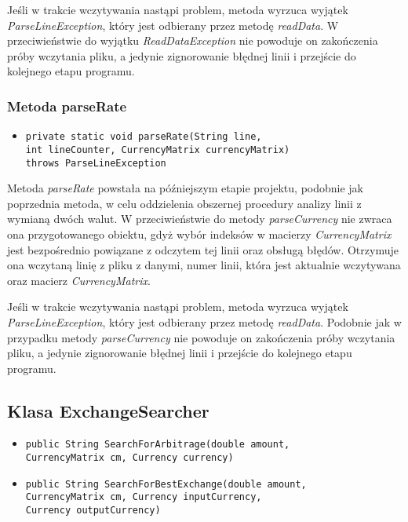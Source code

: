 \documentclass[a4paper,12pt]{article}
\newcommand\tab[1][0.6cm]{\hspace*{#1}}
\begin{document}
Jeśli w trakcie wczytywania nastąpi problem, metoda wyrzuca wyjątek \textit{ParseLineException}, który jest odbierany przez metodę \textit{readData}. W przeciwieństwie do wyjątku \textit{ReadDataException} nie powoduje on zakończenia próby wczytania pliku, a jedynie zignorowanie błędnej linii i przejście do kolejnego etapu programu.

\subsubsection{Metoda parseRate}

\begin{itemize}
\item \begin{lstlisting}
private static void parseRate(String line,
int lineCounter, CurrencyMatrix currencyMatrix)
throws ParseLineException
\end{lstlisting}
\end{itemize}

\tab Metoda \textit{parseRate} powstała na późniejszym etapie projektu, podobnie jak poprzednia metoda, w celu oddzielenia obszernej procedury analizy linii z wymianą dwóch walut. W przeciwieństwie do metody \textit{parseCurrency} nie zwraca ona przygotowanego obiektu, gdyż wybór indeksów w macierzy  \textit{CurrencyMatrix} jest bezpośrednio powiązane z odczytem tej linii oraz obsługą błędów. Otrzymuje ona wczytaną linię z pliku z danymi, numer linii, która jest aktualnie wczytywana oraz macierz \textit{CurrencyMatrix}.

Jeśli w trakcie wczytywania nastąpi problem, metoda wyrzuca wyjątek \textit{ParseLineException}, który jest odbierany przez metodę \textit{readData}. Podobnie jak w przypadku metody \textit{parseCurrency} nie powoduje on zakończenia próby wczytania pliku, a jedynie zignorowanie błędnej linii i przejście do kolejnego etapu programu.

\subsection{Klasa ExchangeSearcher}

\begin{itemize}
\item \begin{lstlisting}
public String SearchForArbitrage(double amount,
CurrencyMatrix cm, Currency currency)
\end{lstlisting}

\item \begin{lstlisting}
public String SearchForBestExchange(double amount,
CurrencyMatrix cm, Currency inputCurrency,
Currency outputCurrency)
\end{lstlisting}
\end{itemize}
\end{document}
